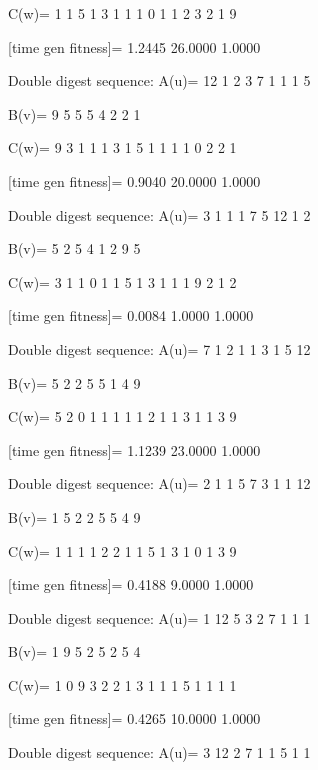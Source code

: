 C(w)=
     1     1     5     1     3     1     1     1     0     1     1     2     3     2     1     9

[time gen fitness]=
    1.2445   26.0000    1.0000

Double digest sequence:
A(u)=
    12     1     2     3     7     1     1     1     5

B(v)=
     9     5     5     5     4     2     2     1

C(w)=
     9     3     1     1     1     3     1     5     1     1     1     1     0     2     2     1

[time gen fitness]=
    0.9040   20.0000    1.0000

Double digest sequence:
A(u)=
     3     1     1     1     7     5    12     1     2

B(v)=
     5     2     5     4     1     2     9     5

C(w)=
     3     1     1     0     1     1     5     1     3     1     1     1     9     2     1     2

[time gen fitness]=
    0.0084    1.0000    1.0000

Double digest sequence:
A(u)=
     7     1     2     1     1     3     1     5    12

B(v)=
     5     2     2     5     5     1     4     9

C(w)=
     5     2     0     1     1     1     1     1     2     1     1     3     1     1     3     9

[time gen fitness]=
    1.1239   23.0000    1.0000

Double digest sequence:
A(u)=
     2     1     1     5     7     3     1     1    12

B(v)=
     1     5     2     2     5     5     4     9

C(w)=
     1     1     1     1     2     2     1     1     5     1     3     1     0     1     3     9

[time gen fitness]=
    0.4188    9.0000    1.0000

Double digest sequence:
A(u)=
     1    12     5     3     2     7     1     1     1

B(v)=
     1     9     5     2     5     2     5     4

C(w)=
     1     0     9     3     2     2     1     3     1     1     1     5     1     1     1     1

[time gen fitness]=
    0.4265   10.0000    1.0000

Double digest sequence:
A(u)=
     3    12     2     7     1     1     5     1     1

